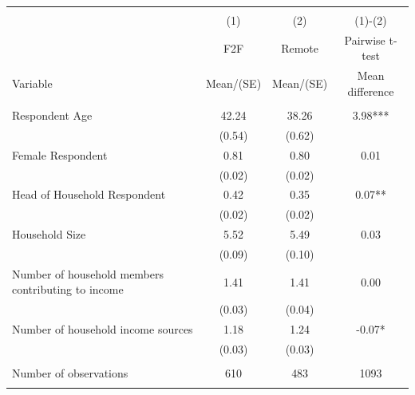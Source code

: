 
\begin{tabular}{@{\extracolsep{5pt}}lccc}
\\[-1.8ex]\hline \hline \\[-1.8ex]
 & \multicolumn{1}{c}{(1)}  & \multicolumn{1}{c}{(2)}  & \multicolumn{1}{c}{(1)-(2)} \\
 & \multicolumn{1}{c}{F2F}  & \multicolumn{1}{c}{Remote}  & \multicolumn{1}{c}{Pairwise t-test}  \\
Variable & Mean/(SE) & Mean/(SE) & Mean difference \\ \hline \\[-1.8ex] 
Respondent Age   & 42.24    & 38.26    & 3.98***   \\
 & (0.54)  & (0.62)  &  \\ [1ex]
Female Respondent   & 0.81    & 0.80    & 0.01   \\
 & (0.02)  & (0.02)  &  \\ [1ex]
Head of Household Respondent   & 0.42    & 0.35    & 0.07**   \\
 & (0.02)  & (0.02)  &  \\ [1ex]
Household Size   & 5.52    & 5.49    & 0.03   \\
 & (0.09)  & (0.10)  &  \\ [1ex]
Number of household members contributing to income   & 1.41    & 1.41    & 0.00   \\
 & (0.03)  & (0.04)  &  \\ [1ex]
Number of household income sources   & 1.18    & 1.24    & -0.07*   \\
 & (0.03)  & (0.03)  &  \\ [1ex]
\hline \\[-1.8ex]
Number of observations  & 610   & 483  & 1093  \\
\hline \hline \\[-1.8ex]

\end{tabular}
